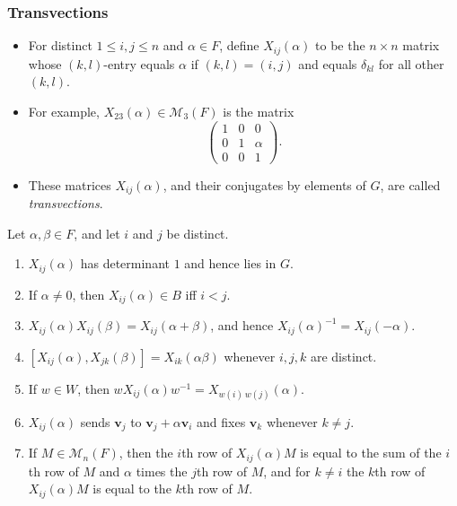 \documentclass[../Odyssey_Project.tex]{subfiles}
\begin{document}
\subsubsection*{Transvections}
\begin{itemize}
    \item For distinct $1 \leq i, j \leq n$ and $\alpha \in F$, define $X_{ij}(\alpha)$ to be the $n \times n$ matrix whose $(k,l)$-entry equals $\alpha$ if $(k,l) = (i,j)$ and equals $\delta_{kl}$ for all other $(k,l)$.
    \item For example, $X_{23}(\alpha) \in \mathcal{M}_3(F)$ is the matrix
    \[
    \begin{pmatrix} 1 & 0 & 0 \\ 0 & 1 & \alpha \\ 0 & 0 & 1 \end{pmatrix}.
    \]
    \item These matrices $X_{ij}(\alpha)$, and their conjugates by elements of $G$, are called \emph{transvections}.
\end{itemize}

\begin{lemma}
\label{lem:4.6}
Let $\alpha, \beta \in F$, and let $i$ and $j$ be distinct.
\begin{enumerate}
    \item[(i)] $X_{ij}(\alpha)$ has determinant $1$ and hence lies in $G$.
    \item[(ii)] If $\alpha \neq 0$, then $X_{ij}(\alpha) \in B$ iff $i < j$.
    \item[(iii)] $X_{ij}(\alpha) X_{ij}(\beta) = X_{ij}(\alpha + \beta)$, and hence $X_{ij}(\alpha)^{-1} = X_{ij}(-\alpha)$.
    \item[(iv)] $[X_{ij}(\alpha), X_{jk}(\beta)] = X_{ik}(\alpha\beta)$ whenever $i, j, k$ are distinct.
    \item[(v)] If $w \in W$, then $w X_{ij}(\alpha) w^{-1} = X_{w(i)\,w(j)}(\alpha)$.
    \item[(vi)] $X_{ij}(\alpha)$ sends $\mathbf{v}_j$ to $\mathbf{v}_j + \alpha \mathbf{v}_i$ and fixes $\mathbf{v}_k$ whenever $k \neq j$.
    \item[(vii)] If $M \in \mathcal{M}_n(F)$, then the $i$th row of $X_{ij}(\alpha) M$ is equal to the sum of the $i$th row of $M$ and $\alpha$ times the $j$th row of $M$, and for $k \neq i$ the $k$th row of $X_{ij}(\alpha) M$ is equal to the $k$th row of $M$.
\end{enumerate}
\end{lemma}
\end{document}

